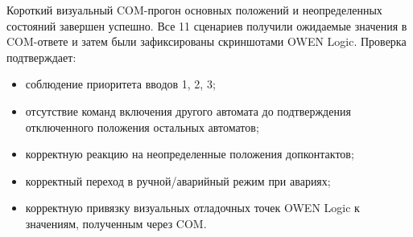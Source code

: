 \documentclass[12pt,a4paper]{article}
\newcommand{\code}[1]{\texttt{\detokenize{#1}}}
\begin{document}
Короткий визуальный COM-прогон основных положений и неопределенных состояний завершен успешно. Все 11 сценариев получили ожидаемые значения в COM-ответе \code{ReadData} и затем были зафиксированы скриншотами OWEN Logic. Проверка подтверждает:

\begin{itemize}[leftmargin=8mm]
  \item соблюдение приоритета вводов 1, 2, 3;
  \item отсутствие команд включения другого автомата до подтверждения отключенного положения остальных автоматов;
  \item корректную реакцию на неопределенные положения допконтактов;
  \item корректный переход в ручной/аварийный режим при авариях;
  \item корректную привязку визуальных отладочных точек OWEN Logic к значениям, полученным через COM.
\end{itemize}
\end{document}
